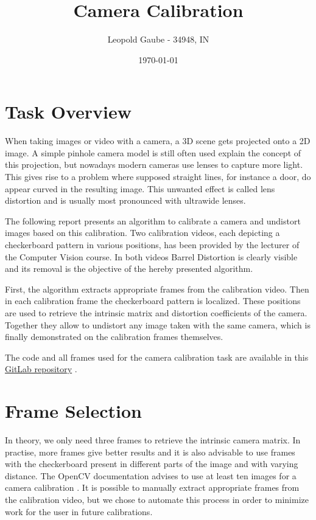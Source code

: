 \documentclass[bibliography=totoc]{scrartcl}
\title{Camera Calibration}
\author{Leopold Gaube - 34948, IN}
\date{\today}
\begin{document}
\maketitle
\tableofcontents

\clearpage

\section{Task Overview}

When taking images or video with a camera, a 3D scene gets projected onto a 2D image.
A simple pinhole camera model is still often used explain the concept of this projection, but nowadays modern cameras use lenses to capture more light.
This gives rise to a problem where supposed straight lines, for instance a door, do appear curved in the resulting image. 
This unwanted effect is called lens distortion and is usually most pronounced with ultrawide lenses.

The following report presents an algorithm to calibrate a camera and undistort images based on this calibration.
Two calibration videos, each depicting a checkerboard pattern in various positions, has been provided by the lecturer of the Computer Vision course.
In both videos Barrel Distortion is clearly visible and its removal is the objective of the hereby presented algorithm.

First, the algorithm extracts appropriate frames from the calibration video.
Then in each calibration frame the checkerboard pattern is localized.
These positions are used to retrieve the intrinsic matrix and distortion coefficients of the camera. 
Together they allow to undistort any image taken with the same camera, which is finally demonstrated on the calibration frames themselves.

The code and all frames used for the camera calibration task are available in this \href{https://gitlab.com/gaubeleo/camera-calibration}{GitLab repository} \cite{Gitlab}.

\section{Frame Selection}
In theory, we only need three frames to retrieve the intrinsic camera matrix.
In practise, more frames give better results and it is also advisable to use frames with the checkerboard present in different parts of the image and with varying distance.
The OpenCV documentation advises to use at least ten images for a camera calibration \cite{CameraCalibration}.
It is possible to manually extract appropriate frames from the calibration video, but we chose to automate this process in order to minimize work for the user in future calibrations. 
\end{document}

